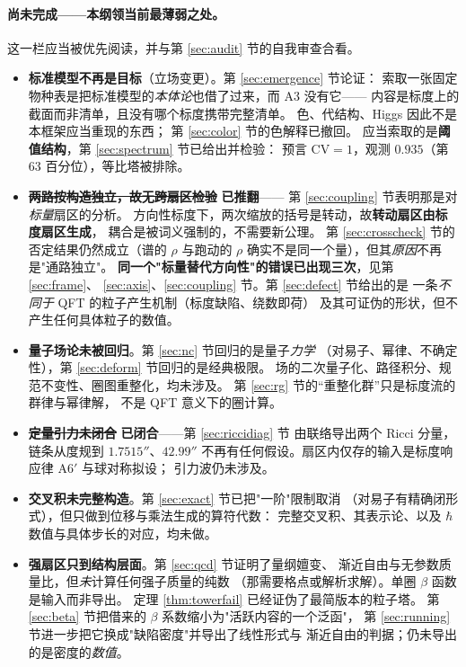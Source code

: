 \documentclass[11pt,a4paper]{article}
\theoremstyle{sudef}
\begin{document}
\paragraph{尚未完成——本纲领当前最薄弱之处。}
这一栏应当被优先阅读，并与第 \ref{sec:audit} 节的自我审查合看。
\begin{itemize}[leftmargin=1.6em]
\item \textbf{标准模型不再是目标}（立场变更）。第 \ref{sec:emergence} 节论证：
      索取一张固定物种表是把标准模型的\emph{本体论}也借了过来，而 A3 没有它——
      内容是标度上的截面而非清单，且没有哪个标度携带完整清单。
      色、代结构、Higgs 因此不是本框架应当重现的东西；
      第 \ref{sec:color} 节的色解释已撤回。
      应当索取的是\textbf{阈值结构}，第 \ref{sec:spectrum} 节已给出并检验：
      预言 $\mathrm{CV}=1$，观测 $0.935$（第 63 百分位），等比塔被排除。
\item \sout{\textbf{两路按构造独立，故无跨扇区检验}} \textbf{已推翻}——
      第 \ref{sec:coupling} 节表明那是对\emph{标量}扇区的分析。
      方向性标度下，两次缩放的括号是转动，故\textbf{转动扇区由标度扇区生成}，
      耦合是被词义强制的，不需要新公理。
      第 \ref{sec:crosscheck} 节的否定结果仍然成立（谱的 $\rho$ 与跑动的 $\rho$
      确实不是同一个量），但其\emph{原因}不再是"通路独立"。
      \textbf{同一个"标量替代方向性"的错误已出现三次}，见第 \ref{sec:frame}、
      \ref{sec:axis}、\ref{sec:coupling} 节。第 \ref{sec:defect} 节给出的是
      一条\emph{不同于} QFT 的粒子产生机制（标度缺陷、绕数即荷）
      及其可证伪的形状，但不产生任何具体粒子的数值。
\item \textbf{量子场论未被回归}。第 \ref{sec:nc} 节回归的是量子\emph{力学}
      （对易子、幂律、不确定性），第 \ref{sec:deform} 节回归的是经典极限。
      场的二次量子化、路径积分、规范不变性、圈图重整化，均未涉及。
      第 \ref{sec:rg} 节的“重整化群”只是标度流的群律与幂律解，
      不是 QFT 意义下的圈计算。
\item \sout{\textbf{定量引力未闭合}} \textbf{已闭合}——第 \ref{sec:riccidiag} 节
      由联络导出两个 Ricci 分量，链条从度规到 $1.7515''$、$42.99''$
      不再有任何假设。扇区内仅存的输入是标度响应律 A6$'$ 与球对称拟设；
      引力波仍未涉及。
\item \textbf{交叉积未完整构造}。第 \ref{sec:exact} 节已把"一阶"限制取消
      （对易子有精确闭形式），但只做到位移与乘法生成的算符代数：
      完整交叉积、其表示论、以及 $\hbar$ 数值与具体步长的对应，均未做。
\item \textbf{强扇区只到结构层面}。第 \ref{sec:qcd} 节证明了量纲嬗变、
      渐近自由与无参数质量比，但\emph{未}计算任何强子质量的纯数
      （那需要格点或解析求解）。单圈 $\beta$ 函数是输入而非导出。
      定理 \ref{thm:towerfail} 已经证伪了最简版本的粒子塔。
      第 \ref{sec:beta} 节把借来的 $\beta$ 系数缩小为"活跃内容的一个泛函"，
      第 \ref{sec:running} 节进一步把它换成"缺陷密度"并导出了线性形式与
      渐近自由的判据；仍未导出的是密度的\emph{数值}。
\end{itemize}
\end{document}
